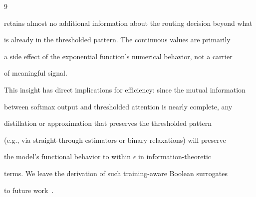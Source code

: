 \documentclass[11pt]{article}
\theoremstyle{definition}
\begin{document}
\begin{thebibliography}{9}
{{{retains almost no additional information about the routing decision beyond what






is already in the thresholded pattern. The continuous values are primarily






a side effect of the exponential function's numerical behavior, not a carrier






of meaningful signal.













This insight has direct implications for efficiency: since the mutual information






between softmax output and thresholded attention is nearly complete, any






distillation or approximation that preserves the thresholded pattern






(e.g., via straight-through estimators or binary relaxations) will preserve






the model's functional behavior to within $\epsilon$ in information-theoretic






terms. We leave the derivation of such training-aware Boolean surrogates






to future work~\cite{parr2026boole,skw2026open}.



















}}}
\end{thebibliography}
\end{document}
